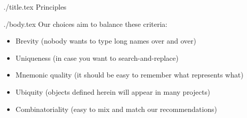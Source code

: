 \documentclass{econtex}
\begin{document}
\begin{verbatimwrite}{./title.tex}
Principles
\end{verbatimwrite}

\title{}

\date{\today}
\maketitle 

\begin{verbatimwrite}{./body.tex}
Our choices aim to balance these criteria:
\begin{itemize}
\item Brevity (nobody wants to type long names over and over)
\item Uniqueness (in case you want to search-and-replace)
\item Mnemonic quality (it should be easy to remember what represents what)
\item Ubiquity (objects defined herein will appear in many projects)
\item Combinatoriality (easy to mix and match our recommendations)
\end{itemize}

\end{verbatimwrite}

\end{document}
